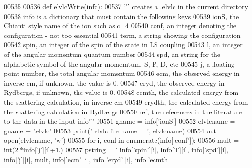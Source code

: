 \begin{DoxyCode}
\hypertarget{namespacepyneb_1_1utils_1_1__chianti__tools_l00535}{}\hyperlink{namespacepyneb_1_1utils_1_1__chianti__tools_ab6f19b7a8594fc425b55d7037d983641}{00535} 
00536 \textcolor{keyword}{def }\hyperlink{namespacepyneb_1_1utils_1_1__chianti__tools_ab6f19b7a8594fc425b55d7037d983641}{elvlcWrite}(info):
00537     \textcolor{stringliteral}{''' creates a .elvlc in the current directory}
00538 \textcolor{stringliteral}{    info is a dictionary that must contain the following keys}
00539 \textcolor{stringliteral}{    ionS, the Chianti style name of the ion such as c\_4}
00540 \textcolor{stringliteral}{    conf, an integer denoting the configuration - not too essential}
00541 \textcolor{stringliteral}{    term, a string showing the configuration}
00542 \textcolor{stringliteral}{    spin, an integer of the spin of the state in LS coupling}
00543 \textcolor{stringliteral}{    l, an integer of the angular momentum quantum number}
00544 \textcolor{stringliteral}{    spd, an string for the alphabetic symbol of the angular momemtum, S, P, D, etc}
00545 \textcolor{stringliteral}{    j, a floating point number, the total angular momentum}
00546 \textcolor{stringliteral}{    ecm, the observed energy in inverse cm, if unknown, the value is 0.}
00547 \textcolor{stringliteral}{    eryd, the observed energy in Rydbergs, if unknown, the value is 0.}
00548 \textcolor{stringliteral}{    ecmth, the calculated energy from the scattering calculation, in inverse cm}
00549 \textcolor{stringliteral}{    erydth, the calculated energy from the scattering calculation in Rydbergs}
00550 \textcolor{stringliteral}{    ref, the references in the literature to the data in the input info'''}
00551     gname = info[\textcolor{stringliteral}{'ionS'}]
00552     elvlcname = gname + \textcolor{stringliteral}{'.elvlc'}
00553     print(\textcolor{stringliteral}{' elvlc file name = '}, elvlcname)
00554     out = open(elvlcname, \textcolor{stringliteral}{'w'})
00555     \textcolor{keywordflow}{for} i,  conf \textcolor{keywordflow}{in} enumerate(info[\textcolor{stringliteral}{'conf'}]):
00556         mult = int(2.*info[\textcolor{stringliteral}{'j'}][i]+1.)
00557         pstring = \textcolor{stringliteral}{'%
      info[\textcolor{stringliteral}{'spin'}][i], info[\textcolor{stringliteral}{'l'}][i], info[\textcolor{stringliteral}{'spd'}][i], info[\textcolor{stringliteral}{'j'}][i], mult, info[\textcolor{stringliteral}{'ecm'}][i], info[\textcolor{stringliteral}{'eryd'}][i], info[\textcolor{stringliteral}{'ecmth
}}
\end{DoxyCode}
